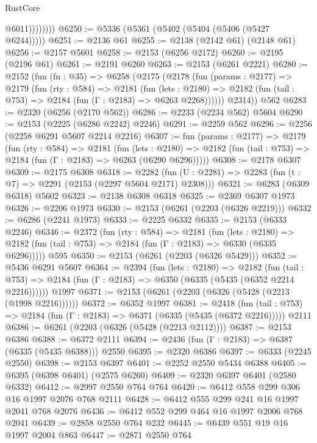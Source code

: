 \begin{lexlean}{RustCore}
\begin{coremodule}
                    @6011))))))))
@6250 := @5336 (@5361 (@5402 (@5404 (@5406 (@5427 @6244)))))
@6251 := @2136 @61
@6255 := @2138 (@2142 @61) (@2148 @61)
@6256 := @2157 @5601
@6258 := @2153 (@6256 @2172)
@6260 := @2195 (@2196 @61)
@6261 := @2191 @6260
@6263 := @2153 (@6261 @2221)
@6280 := @2152
    (fun (fn : @35) =>
    @6258
      (@2175
        (@2178
          (fun (params : @2177) =>
          @2179
            (fun (rty : @584) =>
            @2181
              (fun (lets : @2180) =>
              @2182 (fun (tail : @753) => @2184 (fun (Γ : @2183) => @6263 @2268))))))
        @2314))
    @562
@6283 := @2320 (@6256 (@2170 @562))
@6286 := @2233 (@2234 @562) @5604
@6290 := @2153 (@2225 (@6286 @2242) @2246)
@6291 := @2259 @562
@6296 := @2256 (@2258 @6291 @5607 @2214 @2216)
@6307 := fun (params : @2177) =>
  @2179
    (fun (rty : @584) =>
    @2181
      (fun (lets : @2180) =>
      @2182 (fun (tail : @753) => @2184 (fun (Γ : @2183) => @6263 (@6290 @6296)))))
@6308 := @2178 @6307
@6309 := @2175 @6308
@6318 := @2282 (fun (U : @2281) => @2283 (fun (t : @7) => @2291 (@2153 (@2297 @5604 @2171) @2308)))
@6321 := @6283 (@6309 @6318) @5602
@6323 := @2138 @6308 @6318
@6325 := @2369 @6307 @1973
@6326 := @2206 @1973
@6330 := @2153 (@6261 (@2203 (@6326 @2219)))
@6332 := @6286 (@2241 @1973)
@6333 := @2225 @6332
@6335 := @2153 (@6333 @2246)
@6346 := @2372
    (fun (rty : @584) =>
    @2181
      (fun (lets : @2180) =>
      @2182 (fun (tail : @753) => @2184 (fun (Γ : @2183) => @6330 (@6335 @6296)))))
    @595
@6350 := @2153 (@6261 (@2203 (@6326 @5429)))
@6352 := @5436 @6291 @5607
@6364 := @2394
    (fun (lets : @2180) =>
    @2182
      (fun (tail : @753) => @2184 (fun (Γ : @2183) => @6350 (@6335 (@5435 (@6352 @2214 @2216))))))
    @1997
@6371 := @2153 (@6261 (@2203 (@6326 (@5428 (@2213 (@1998 @2216))))))
@6372 := @6352 @1997
@6381 := @2418
    (fun (tail : @753) => @2184 (fun (Γ : @2183) => @6371 (@6335 (@5435 (@6372 @2216)))))
    @2111
@6386 := @6261 (@2203 (@6326 (@5428 (@2213 @2112))))
@6387 := @2153 @6386
@6388 := @6372 @2111
@6394 := @2436 (fun (Γ : @2183) => @6387 (@6335 (@5435 @6388))) @2550
@6395 := @2320 @6386
@6397 := @6333 (@2245 @2550)
@6398 := @2153 @6397
@6401 := @2252 @2550 @5434 @6388
@6405 := @6395 (@6398 @6401) (@2575 @6260)
@6409 := @2320 @6397 @6401 (@2580 @6332)
@6412 := @2997 @2550 @764 @764
@6420 := @6412 @558 @299 @306 @16 @1997 @2076 @768 @2111
@6428 := @6412 @555 @299 @241 @16 @1997 @2041 @768 @2076
@6436 := @6412 @552 @299 @464 @16 @1997 @2006 @768 @2041
@6439 := @2858 @2550 @764 @232
@6445 := @6439 @551 @19 @16 @1997 @2004 @863
@6447 := @2871 @2550 @764

\end{coremodule}
\end{lexlean}
